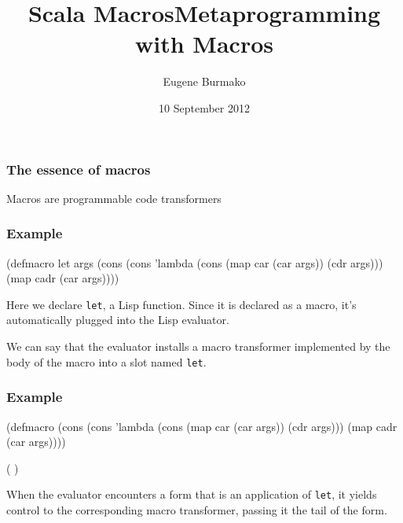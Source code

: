 \documentclass[hyperref={bookmarks=false}]{beamer}
\title{Scala Macros}
\begin{document}
\title{Metaprogramming with Macros}
\author{Eugene Burmako}
\date{10 September 2012}
{
\begin{frame}
  \titlepage
\end{frame}
}

\begin{frame}[fragile]
\frametitle{The essence of macros}
Macros are programmable code transformers
\end{frame}

\begin{frame}[fragile]
\frametitle{Example} %

\begin{lstlistinglike}
\begin{semiverbatim}
(\alert{defmacro} let args
  (cons
   (cons 'lambda
         (cons (map car (car args))
               (cdr args)))
   (map cadr (car args))))
\end{semiverbatim}
\end{lstlistinglike}

Here we declare \texttt{let}, a Lisp function. Since it is declared as a macro,
it's automatically plugged into the Lisp evaluator.

We can say that the evaluator installs a macro transformer implemented by the body of the macro
into a slot named \texttt{let}.
\end{frame}

\begin{frame}[fragile]
\frametitle{Example} %

\begin{lstlistinglike}
\begin{semiverbatim}
(defmacro \text{\color{blue}{let}} \text{\color{violet}{args}}
  (cons
   (cons 'lambda
         (cons (map car (car args))
               (cdr args)))
   (map cadr (car args))))

(\text{\color{blue}{let}} \text{\color{violet}{((x 40) (y 2)) (print (+ x y))}})
\end{semiverbatim}
\end{lstlistinglike}

When the evaluator encounters a form that is an application of \texttt{let},
it yields control to the corresponding macro transformer,
passing it the tail of the form.
\end{frame}
\end{document}
